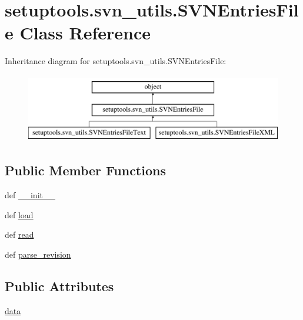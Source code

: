 \hypertarget{classsetuptools_1_1svn__utils_1_1SVNEntriesFile}{}\section{setuptools.\+svn\+\_\+utils.\+S\+V\+N\+Entries\+File Class Reference}
\label{classsetuptools_1_1svn__utils_1_1SVNEntriesFile}
Inheritance diagram for setuptools.\+svn\+\_\+utils.\+S\+V\+N\+Entries\+File\+:\begin{figure}[H]
\begin{center}
\leavevmode
\includegraphics[height=3.000000cm]{classsetuptools_1_1svn__utils_1_1SVNEntriesFile}
\end{center}
\end{figure}
\subsection*{Public Member Functions}
\begin{DoxyCompactItemize}
\item 
def \hyperlink{classsetuptools_1_1svn__utils_1_1SVNEntriesFile_a8c95a6795c464e988c5296c70788628d}{\+\_\+\+\_\+init\+\_\+\+\_\+}
\item 
def \hyperlink{classsetuptools_1_1svn__utils_1_1SVNEntriesFile_a086ec32409d48555907b12d5d654950d}{load}
\item 
def \hyperlink{classsetuptools_1_1svn__utils_1_1SVNEntriesFile_a7d15c1f7c34aff74e0550f4a2631e11f}{read}
\item 
def \hyperlink{classsetuptools_1_1svn__utils_1_1SVNEntriesFile_a31cdee04d340ffb3932c4a0e50c45da0}{parse\+\_\+revision}
\end{DoxyCompactItemize}
\subsection*{Public Attributes}
\begin{DoxyCompactItemize}
\item 
\hyperlink{classsetuptools_1_1svn__utils_1_1SVNEntriesFile_a0422e7aecc9dac3bbb952280d8676b52}{data}
\end{DoxyCompactItemize}


